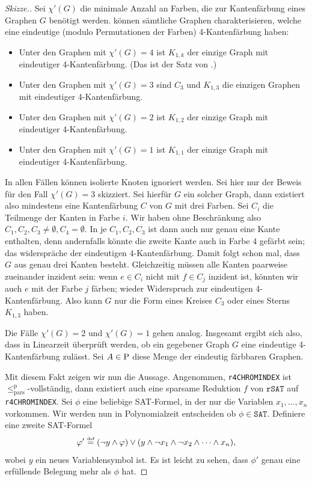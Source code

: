 \begin{proof}[Skizze.]
    Sei $\chi'(G)$ die minimale Anzahl an Farben, die zur Kantenfärbung eines Graphen $G$ benötigt werden.
    \citeauthor{cai_complexity_2020} können  
    sämtliche Graphen charakterisieren, welche eine eindeutige (modulo Permutationen der Farben) 4-Kantenfärbung haben:
    \begin{itemize}[nosep,beginpenalty=0]
        \item Unter den Graphen mit $\chi'(G)=4$ ist $K_{1,k}$ der einzige Graph mit eindeutiger 4-Kantenfärbung. (Das ist der Satz von \cite{thomason_hamiltonian_1978}.)
        \item Unter den Graphen mit $\chi'(G)=3$ sind $C_3$ und $K_{1,3}$ die einzigen Graphen mit eindeutiger 4-Kantenfärbung.
        \item Unter den Graphen mit $\chi'(G)=2$ ist $K_{1,2}$ der einzige Graph mit eindeutiger 4-Kantenfärbung.
        \item Unter den Graphen mit $\chi'(G)=1$ ist $K_{1,1}$ der einzige Graph mit eindeutiger 4-Kantenfärbung.
    \end{itemize}
    In allen Fällen können isolierte Knoten ignoriert werden. Sei hier nur der Beweis für den Fall $\chi'(G)=3$ skizziert. Sei hierfür $G$ ein solcher Graph, dann existiert also mindestens eine Kantenfärbung $C$ von $G$ mit drei Farben. Sei $C_i$ die Teilmenge der Kanten in Farbe $i$.
    Wir haben ohne Beschränkung also $C_1,C_2,C_3\neq\emptyset, C_4=\emptyset$.
    In je $C_1,C_2,C_3$ ist dann auch nur genau eine Kante enthalten, denn andernfalls könnte die zweite Kante auch in Farbe $4$ gefärbt sein; das widerspräche der eindeutigen 4-Kantenfärbung.
    Damit folgt schon mal, dass $G$ aus genau drei Kanten besteht.
    Gleichzeitig müssen alle Kanten paarweise zueinander inzident sein: wenn $e\in C_i$ nicht mit $f\in C_j$ inzident ist, könnten wir auch $e$ mit der Farbe $j$ färben; wieder Widerspruch zur eindeutigen 4-Kantenfärbung.
    Also kann $G$ nur die Form eines Kreises $C_3$ oder eines Sterns $K_{1,3}$ haben.

    Die Fälle $\chi'(G)=2$ und $\chi'(G)=1$ gehen analog.
    Insgesamt ergibt sich also, dass in Linearzeit überprüft werden, ob ein gegebener Graph $G$ eine eindeutige 4-Kantenfärbung zulässt. Sei $A\in \P$ diese Menge der eindeutig färbbaren Graphen.

    Mit diesem Fakt zeigen wir nun die Aussage.
    Angenommen, \texttt{r4CHROMINDEX} ist $\leq_\mathrm{pars}^\mathrm p$-vollständig, dann existiert auch eine sparsame Reduktion $f$ von $\mathtt{rSAT}$ auf \texttt{r4CHROMINDEX}.
    Sei $\phi$ eine beliebige SAT-Formel, in der nur die Variablen $x_1, \dots, x_n$ vorkommen.
    Wir werden nun in Polynomialzeit entscheiden ob $\phi\in \mathtt{SAT}$. 
    Definiere eine zweite SAT-Formel
    \[ \phi' \defeq (\neg y \land \phi) \lor (y\land \neg x_1 \land \neg x_2 \land\cdots\land x_n), \]
    wobei $y$ ein neues Variablensymbol ist. Es ist leicht zu sehen, dass $\phi'$ genau eine erfüllende Belegung mehr als $\phi$ hat.


\end{proof}
